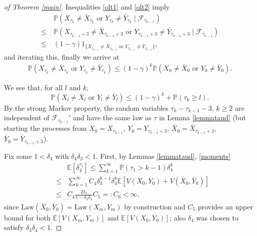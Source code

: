 \documentclass{article}
\def\mE{\mathbb{E}}
\begin{document}
\begin{proof}[of Theorem \ref{main}]
Inequalities \eqref{olt1} and \eqref{olt2} imply
\begin{align*}
 & \mathbb{P}\left(X_{\tau_k}\neq\bar{X}_{\tau_k}\mbox{ or }
Y_{\tau_k}\neq\bar{Y}_{\tau_k}\mid\mathcal{F}_{\tau_{k-1}}\right)\\
\leq ~& \mathbb{P}\left(X_{\tau_{k-1}+3}\neq\bar{X}_{\tau_{k-1}+3}\mbox{ or }Y_{\tau_{k-1}+3}\neq\bar{Y}_{\tau_{k-1}+3}
\mid\mathcal{F}_{\tau_{k-1}}\right)\\
\leq ~& (1-\gamma)1_{\{X_{\tau_{k-1}}\neq\bar{X}_{\tau_{k-1}}\mbox{ or }
Y_{\tau_{k-1}}\neq
\bar{Y}_{\tau_{k-1}}\}},
\end{align*}
and iterating this, finally we arrive at
\begin{align*}
\mathbb{P}(X_{\tau_k}  \!\neq\! \bar{X}_{\tau_k}\mbox{ or }Y_{\tau_k} \!\neq\! \bar{Y}_{\tau_k})
  \!\leq\! (1 \!-\!\gamma)^k
\mathbb{P}(X_{0} \!\neq\! \bar{X}_{0}\mbox{ or }Y_{0} \!\neq\! \bar{Y}_{0}).
  \end{align*}

We see that, for all $l$ and $k$,
\begin{equation}
    \label{almostcoupling}
\mathbb{P}(X_{l}\neq \bar{X}_{l}\mbox{ or }Y_{l}\neq\bar{Y}_{l})\leq 
(1-\gamma)^k+\mathbb{P}(\tau_k\geq l).
\end{equation}
By the strong Markov property, the random variables $\tau_k-\tau_{k-1}-3$, $k\geq 2$
are independent of $\mathcal{F}_{\tau_{k-1}}'$ and have the same law as
$\tau$ in Lemma \ref{lemmataud} (but starting the processes from $X_{0}=X_{\tau_{k-1}}$, 
$Y_{0}=Y_{\tau_{k-1}+3}$, $\bar{X}_{0}=\bar{X}_{\tau_{k-1}+3}$, $\bar{Y}_{0}=\bar{Y}_{\tau_{k-1}+3}$). 

Fix some $1<\delta_4$ with $\delta_4\delta_3<1$.
First, by Lemmas \ref{lemmataud}, \ref{moments}
\begin{eqnarray*}
&& 
\mE[\delta_4^{\tau_1}]\leq \sum_{k=1}^{\infty}\mathbb{P}(\tau_{1}>k-1)\delta_{4}^{k}\\
&\leq&{}
\sum_{k=1}^{\infty}C_{4}\delta_{3}^{k-1}
\delta_{4}^{k}\mathbb{E}[V(X_{0},Y_{0})+V(\bar{X}_{0},\bar{Y}_{0})]\\ &\leq&
C_{4}\frac{2\delta_{4}}{1-\delta_{3}\delta_{4}}C_{5}=:C_{6}<\infty,
\end{eqnarray*} 
since $\mathrm{Law}(\bar{X}_{0},\bar{Y}_{0})=\mathrm{Law}(X_{m},Y_{m})$ by construction and $C_{5}$ provides an
upper bound for both $\mathbb{E}[V(X_{m},Y_{m})]$ and $\mathbb{E}[V(X_{0},Y_{0})]$; also $\delta_{4}$
was chosen to satisfy $\delta_{3}\delta_{4}<1$.


\end{proof}
\end{document}
